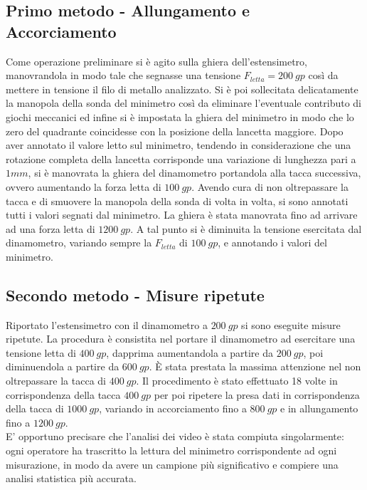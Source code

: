 \documentclass[a4paper,11pt,oneside]{article}
\begin{document}
\subsection{Primo metodo - Allungamento e Accorciamento}%
Come operazione preliminare si è agito sulla ghiera dell'estensimetro, manovrandola in modo tale che segnasse una tensione $F_{letta}=\SI{200}{gp}$ così da mettere in tensione il filo di metallo analizzato. Si è poi sollecitata delicatamente la manopola della sonda del minimetro così da eliminare l'eventuale contributo di giochi meccanici ed infine si è impostata la ghiera del minimetro in modo che lo zero del quadrante coincidesse con la posizione della lancetta maggiore. Dopo aver annotato il valore letto sul minimetro, tendendo in considerazione che una rotazione completa della lancetta corrisponde una variazione di lunghezza pari a $\num{1} \si{mm}$, si è manovrata la ghiera del dinamometro portandola alla tacca successiva, ovvero aumentando la forza letta di $\SI{100}{gp}$. Avendo cura di non oltrepassare la tacca e di smuovere la manopola della sonda di volta in volta, si sono annotati tutti i valori segnati dal minimetro. La ghiera è stata manovrata fino ad arrivare ad una forza letta di $\SI{1200}{gp}$. A tal punto si è diminuita la tensione esercitata dal dinamometro, variando sempre la $F_{letta}$ di $\SI{100}{gp}$, e annotando i valori del minimetro.\\

\subsection{Secondo metodo - Misure ripetute}%
Riportato l'estensimetro con il dinamometro a $\SI{200}{gp}$ si sono eseguite misure ripetute. La procedura è consistita nel portare il dinamometro ad esercitare una tensione letta di $\SI{400}{gp}$, dapprima aumentandola a partire da $\SI{200}{gp}$, poi diminuendola a partire da $\SI{600}{gp}$. È stata prestata la massima attenzione nel non oltrepassare la tacca di $\SI{400}{gp}$. %
Il procedimento è stato effettuato 18 volte in corrispondenza della tacca $\SI{400}{gp}$ per poi ripetere la presa dati in corrispondenza della tacca di $\SI{1000}{gp}$, variando in accorciamento fino a $\SI{800}{gp}$ e in allungamento fino a $\SI{1200}{gp}$.\\
E' opportuno precisare che l'analisi dei video è stata compiuta singolarmente: ogni operatore ha trascritto la lettura del minimetro corrispondente ad ogni misurazione, in modo da avere un campione più significativo e compiere una analisi statistica più accurata.
\end{document}
